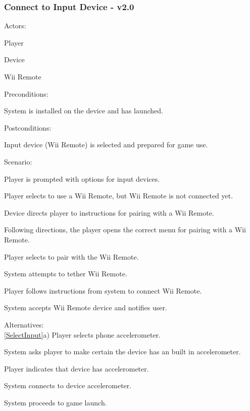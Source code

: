 \documentclass[12pt]{article}
\newenvironment{itemize*}%
  {\begin{itemize}%
  	\setlength{\parsep}{0pt}
    \setlength{\itemsep}{0pt}%
    \setlength{\parskip}{0pt}}%
  {\end{itemize}}
\newenvironment{enumerate*}%
  {\begin{enumerate}%
  	\setlength{\parsep}{0pt}
    \setlength{\itemsep}{0pt}%
    \setlength{\parskip}{0pt}}%
  {\end{enumerate}}
\begin{document}
\subsubsection*{Connect to Input Device - v2.0}
Actors:
\begin{itemize*}
\item Player
\item Device 
\item Wii Remote
\end{itemize*}
Preconditions:
\begin{itemize*}
\item System is installed on the device and has launched.
\end{itemize*}
Postconditions:
\begin{itemize*}
\item Input device (Wii Remote) is selected and prepared for game use.
\end{itemize*}
Scenario:
\begin{enumerate*}
\item Player is prompted with options for input devices.
\item \label{SelectInput} Player selects to use a Wii Remote, but Wii Remote
is not connected yet.
\item \label{PromptToConnect} Device directs player to instructions for 
pairing with a Wii Remote.
\item \label{MenuToWii}Following directions, the player opens the correct 
menu for pairing with a Wii Remote.
\item Player selects to pair with the Wii Remote.
\item \label{ConnectWiimote}System attempts to tether Wii Remote.
\item Player follows instructions from system to connect Wii Remote.
\item System accepts Wii Remote device and notifies user.
\end{enumerate*}
Alternatives:\\
\ref{SelectInput}a) Player selects phone accelerometer.  
\begin{enumerate*}
\item System asks player to make certain the device has an built in 
  accelerometer.
\item Player indicates that device has accelerometer.
\item System connects to device accelerometer.
\item System proceeds to game launch.
\end{enumerate*}
\end{document}
